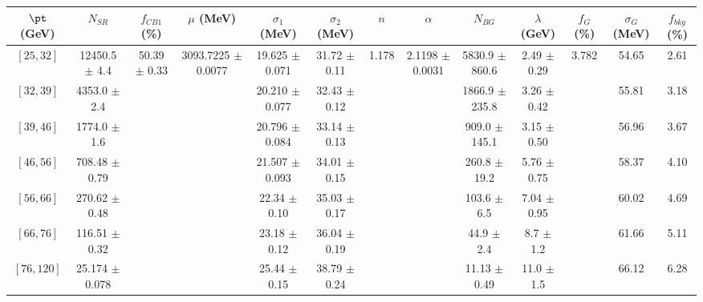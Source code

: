 \begin{tabular}{c||c|c|c|c|c|c|c|c|c|c|c||c}
$\pt$ (GeV) & $N_{SR}$ & $f_{CB1}$ (\%) & $\mu$ (MeV) & $\sigma_1$ (MeV) & $\sigma_2$ (MeV) & $n$ & $\alpha$ & $N_{BG}$ & $\lambda$ (GeV) & $f_G$ (\%) & $\sigma_G$ (MeV) & $f_{bkg}$ (\%) \\
\hline
$[25, 32]$ & 12450.5 $\pm$ 4.4 & \multirow{7}{*}{50.39 $\pm$ 0.33} & \multirow{7}{*}{3093.7225 $\pm$ 0.0077} & 19.625 $\pm$ 0.071 & 31.72 $\pm$ 0.11 & \multirow{7}{*}{1.178} & \multirow{7}{*}{2.1198 $\pm$ 0.0031} & 5830.9 $\pm$ 860.6 & 2.49 $\pm$ 0.29 & \multirow{7}{*}{3.782} & 54.65 & 2.61\\
$[32, 39]$ & 4353.0 $\pm$ 2.4 &  &  & 20.210 $\pm$ 0.077 & 32.43 $\pm$ 0.12 &  &  & 1866.9 $\pm$ 235.8 & 3.26 $\pm$ 0.42 &  & 55.81 & 3.18\\
$[39, 46]$ & 1774.0 $\pm$ 1.6 &  &  & 20.796 $\pm$ 0.084 & 33.14 $\pm$ 0.13 &  &  & 909.0 $\pm$ 145.1 & 3.15 $\pm$ 0.50 &  & 56.96 & 3.67\\
$[46, 56]$ & 708.48 $\pm$ 0.79 &  &  & 21.507 $\pm$ 0.093 & 34.01 $\pm$ 0.15 &  &  & 260.8 $\pm$ 19.2 & 5.76 $\pm$ 0.75 &  & 58.37 & 4.10\\
$[56, 66]$ & 270.62 $\pm$ 0.48 &  &  & 22.34 $\pm$ 0.10 & 35.03 $\pm$ 0.17 &  &  & 103.6 $\pm$ 6.5 & 7.04 $\pm$ 0.95 &  & 60.02 & 4.69\\
$[66, 76]$ & 116.51 $\pm$ 0.32 &  &  & 23.18 $\pm$ 0.12 & 36.04 $\pm$ 0.19 &  &  & 44.9 $\pm$ 2.4 & 8.7 $\pm$ 1.2 &  & 61.66 & 5.11\\
$[76, 120]$ & 25.174 $\pm$ 0.078 &  &  & 25.44 $\pm$ 0.15 & 38.79 $\pm$ 0.24 &  &  & 11.13 $\pm$ 0.49 & 11.0 $\pm$ 1.5 &  & 66.12 & 6.28\\
\end{tabular}
